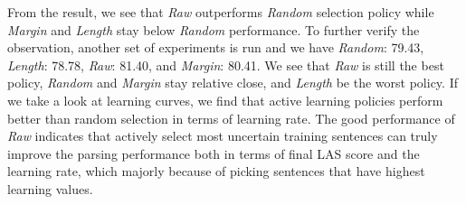 \documentclass[11pt,letterpaper]{article}
\begin{document}
From the result, we see that \emph{Raw} outperforms \emph{Random} selection policy while \emph{Margin} and \emph{Length}
stay below \emph{Random} performance. To further verify the observation, another set of experiments is run and we have
\emph{Random}: 79.43, \emph{Length}: 78.78, \emph{Raw}: 81.40, and \emph{Margin}: 80.41. We see that \emph{Raw} is still
the best policy, \emph{Random} and \emph{Margin} stay relative close, and \emph{Length} be the worst policy. If we take a look
at learning curves, we find that active learning policies perform better than random selection in terms of learning rate. The good
performance of \emph{Raw} indicates that actively select most uncertain training sentences can truly improve
the parsing performance both in terms of final LAS score and the learning rate, which majorly because of picking sentences
that have highest learning values.
\end{document}
